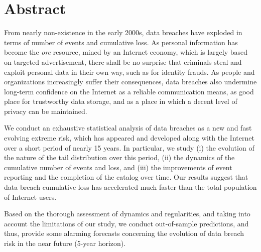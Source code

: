 \section*{Abstract}
From nearly non-existence in the early 2000s, data breaches have exploded in terms of number of events and cumulative loss. As personal information has become the {\it ore} resource, mined by an Internet economy, which is largely based on targeted advertisement, there shall be no surprise that criminals steal and exploit personal data in their own way, such as for identity frauds. As people and organizations increasingly suffer their consequences, data breaches also undermine long-term confidence on the Internet as a reliable communication means, as good place for trustworthy data storage, and as a place in which a decent level of privacy can be maintained.



We conduct an exhaustive statistical analysis of data breaches as a new and fast evolving extreme risk, which has appeared and developed along with the Internet over a short period of nearly 15 years. In particular, we study (i) the evolution of the nature of the tail distribution over this period, (ii) the dynamics of the cumulative number of events and loss, and (iii) the improvements of event reporting and the completion of the catalog over time. Our results suggest that data breach cumulative loss has accelerated much faster than the total population of Internet users.

Based on the thorough assessment of dynamics and regularities, and taking into account the limitations of our study, we conduct out-of-sample predictions, and thus, provide some alarming forecasts concerning the evolution of data breach risk in the near future (5-year horizon).

